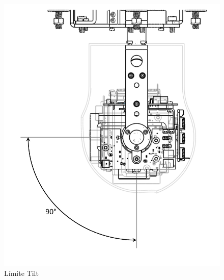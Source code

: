 \begin{figure}[H]
\centering \includegraphics[scale=0.45,trim = 0mm 20mm 0mm 0mm]{img/Limit.pdf}
\caption{L\'{i}mite Tilt}
\label{fig:LimTilt}
\end{figure} 

